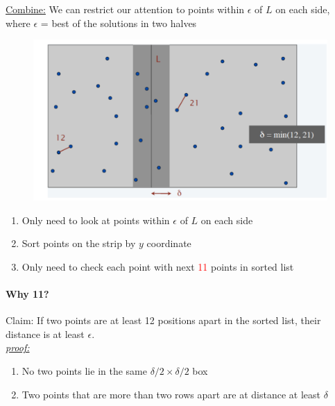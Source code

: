 \documentclass[11pt]{article}
\newcommand{\under}[1]{\underline{#1}}
\newcommand{\proof}[0]{\textit{\underline{proof:} }}
\begin{document}
\under{Combine:} We can restrict our attention to points within $\epsilon$ of $L$ on each side, where $\epsilon$ = best of the solutions in two halves

\begin{figure}[h]
	\centering
	\includegraphics[scale=0.5]{p2}
\end{figure}

\begin{enumerate}
	\item Only need to look at points within $\epsilon$ of $L$ on each side
	\item Sort points on the strip by $y$ coordinate
	\item Only need to check each point with next \textcolor{red}{11} points in sorted list
\end{enumerate}
\paragraph{Why 11?}
Claim: If two points are at least 12 positions apart in the sorted list, their distance is at least $\epsilon$. \\
\proof \\
\begin{enumerate}
	\item No two points lie in the same $\delta / 2 \times \delta / 2$ box
	\item Two points that are more than two rows apart are at distance at least $\delta$
\end{enumerate}
\end{document}
